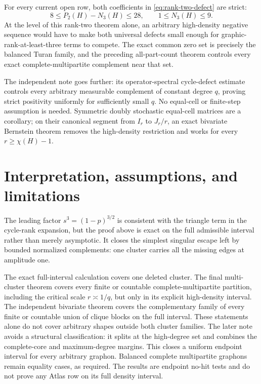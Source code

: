 \documentclass[11pt]{article}
\begin{document}
For every current open row, both coefficients in
\eqref{eq:rank-two-defect} are strict:
\[
 8\leq P_2(H)-N_3(H)\leq28,
 \qquad 1\leq N_3(H)\leq9.
\]
At the level of this rank-two theorem alone, an arbitrary high-density
negative sequence would have to make both universal defects small enough for
graphic-rank-at-least-three terms to compete.  The exact common zero set is
precisely the balanced Turan family, and the preceding all-part-count theorem
controls every exact complete-multipartite complement near that set.

The independent note
 goes further: its
operator-spectral cycle-defect estimate controls every arbitrary measurable
complement of constant degree $q$, proving strict positivity uniformly for
sufficiently small $q$.  No equal-cell or finite-step assumption is needed.
Symmetric doubly stochastic equal-cell matrices are a corollary; on their
canonical segment from $I_r$ to $J_r/r$, an exact bivariate Bernstein theorem
removes the high-density restriction and works for every
$r\geq\chi(H)-1$.

\section{Interpretation, assumptions, and limitations}

The leading factor $s^3=(1-p)^{3/2}$ is consistent with the triangle term in
the cycle-rank expansion, but the proof above is exact on the full admissible
interval rather than merely asymptotic.  It closes the simplest singular
escape left by bounded normalized complements: one cluster carries all the
missing edges at amplitude one.

The exact full-interval calculation covers one deleted cluster.  The final
multi-cluster theorem covers every finite or countable complete-multipartite
partition, including the critical scale $r\asymp1/q$, but only in its
explicit high-density interval.  The independent bivariate theorem covers
the complementary family of every finite or countable union of clique blocks
on the full interval.  These statements alone do not cover arbitrary shapes
outside both cluster families.  The later note
 avoids a structural
classification: it splits at the high-degree set and combines the
complete-core and maximum-degree margins.  This closes a uniform endpoint
interval for every arbitrary graphon.  Balanced complete multipartite
graphons remain equality cases, as required.  The results are endpoint
no-hit tests and do not prove any Atlas row on its full density interval.
\end{document}
